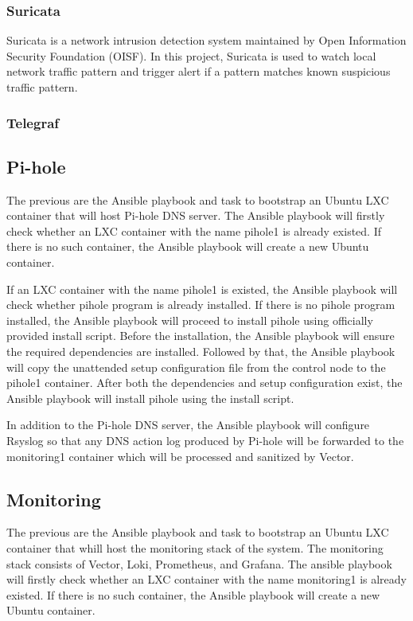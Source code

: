 \documentclass[../index.tex]{subfiles}
\begin{document}
\subsubsection{Suricata}

Suricata is a network intrusion detection system maintained by Open Information Security Foundation
(OISF). In this project, Suricata is used to watch local network traffic pattern and trigger alert
if a pattern matches known suspicious traffic pattern.

\subsubsection{Telegraf}

\subsection{Pi-hole}

The previous are the Ansible playbook and task to bootstrap an Ubuntu LXC container that will host
Pi-hole DNS server. The Ansible playbook will firstly check whether an LXC container with the name
pihole1 is already existed. If there is no such container, the Ansible playbook will create a new
Ubuntu container.

If an LXC container with the name pihole1 is existed, the Ansible playbook will check whether pihole
program is already installed. If there is no pihole program installed, the Ansible playbook will
proceed to install pihole using officially provided install script. Before the installation, the
Ansible playbook will ensure the required dependencies are installed. Followed by that, the Ansible
playbook will copy the unattended setup configuration file from the control node to the pihole1
container. After both the dependencies and setup configuration exist, the Ansible playbook will
install pihole using the install script.

In addition to the Pi-hole DNS server, the Ansible playbook will configure Rsyslog so that any DNS
action log produced by Pi-hole will be forwarded to the monitoring1 container which will be
processed and sanitized by Vector.

\subsection{Monitoring}

The previous are the Ansible playbook and task to bootstrap an Ubuntu LXC container that whill host
the monitoring stack of the system. The monitoring stack consists of Vector, Loki, Prometheus, and
Grafana. The ansible playbook will firstly check whether an LXC container with the name monitoring1
is already existed. If there is no such container, the Ansible playbook will create a new Ubuntu
container.
\end{document}
